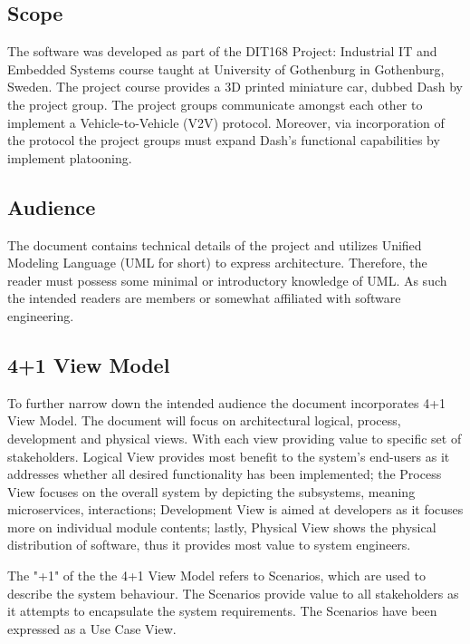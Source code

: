 \documentclass[12pt]{article}
\begin{document}
\subsection{Scope}
The software was developed as part of the DIT168 Project: Industrial IT and Embedded Systems course taught at University of Gothenburg in Gothenburg, Sweden. The project course provides a 3D printed miniature car, dubbed Dash by the project group. The project groups communicate amongst each other to implement a Vehicle-to-Vehicle (V2V) protocol. Moreover, via incorporation of the protocol the project groups must expand Dash’s functional capabilities by implement platooning.\par

\subsection{Audience}
The document contains technical details of the project and utilizes Unified Modeling Language (UML for short) to express architecture. Therefore, the reader must possess some minimal or introductory knowledge of UML. As such the intended readers are members or somewhat affiliated with software engineering.

\subsection{4+1 View Model}
To further narrow down the intended audience the document incorporates 4+1 View Model. The document will focus on architectural logical, process, development and physical views. With each view providing value to specific set of stakeholders. Logical View provides most benefit to the system's end-users as it addresses whether all desired functionality has been implemented; the Process View focuses on the overall system by depicting the subsystems, meaning microservices, interactions; Development View is aimed at developers as it focuses more on individual module contents; lastly, Physical View shows the physical distribution of software, thus it provides most value to system engineers. \par
The "+1" of the the 4+1 View Model refers to Scenarios, which are used to describe the system behaviour. The Scenarios provide value to all stakeholders as it attempts to encapsulate the system requirements. The Scenarios have been expressed as a Use Case View. \par
\end{document}
